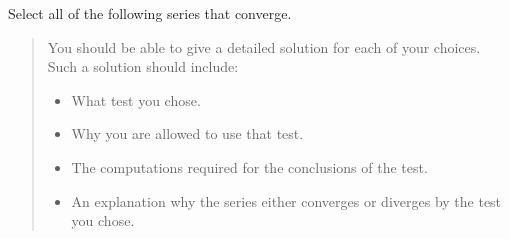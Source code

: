 \documentclass{ximera}
\author{Jim Talamo}
\begin{document}
\begin{exercise}

Select all of the following series that converge.  

\begin{selectAll}
\end{selectAll}

\begin{quote}
You should be able to give a detailed solution for each of your choices.  Such a solution should include:

\begin{itemize}
\item What test you chose.
\item Why you are allowed to use that test.
\item The computations required for the conclusions of the test.
\item An explanation why the series either converges or diverges by the test you chose.
\end{itemize}

\end{quote}


\end{exercise}
\end{document}
